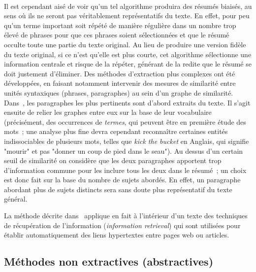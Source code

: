\documentclass[a4paper, 12pt]{article}
\begin{document}
\paragraph{}
Il est cependant aisé de voir qu'un tel algorithme produira des résumés biaisés, au sens où ils ne seront pas véritablement représentatifs du texte. En effet, pour peu qu'un terme important soit répété de manière régulière dans un nombre trop élevé de phrases pour que ces phrases soient sélectionnées et que le résumé occulte toute une partie du texte original. Au lieu de produire une version fidèle du texte original, si ce n'est qu'elle est plus courte, cet algorithme sélectionne une information centrale et risque de la répéter, générant de la redite que le résumé se doit justement d'éliminer. Des méthodes d'extraction plus complexes ont été développées, en faisant notamment intervenir des mesures de similarité entre unités syntaxiques (phrases, paragraphes) au sein d'un graphe de similarité. Dans~\cite{salton_automatic_1997}, les paragraphes les plus pertinents sont d'abord extraits du texte. Il s'agit ensuite de relier les graphes entre eux sur la base de leur vocabulaire (précisément, des occurrences de \emph{termes}, qui peuvent être en première étude des mots~; une analyse plus fine devra cependant reconnaître certaines entités indissociables de plusieurs mots, telles que \textit{kick the bucket} en Anglais, qui signifie "mourir" et pas "donner un coup de pied dans le seau"). Au dessus d'un certain seuil de similarité on considère que les deux paragraphes apportent trop d'information commune pour les inclure tous les deux dans le résumé~; un choix est donc fait sur la base du nombre de sujets abordés. En effet, un paragraphe abordant plus de sujets distincts sera sans doute plus représentatif du texte général.

La méthode décrite dans~\cite{salton_automatic_1997} applique en fait à l'intérieur d'un texte des techniques de récupération  de l'information (\emph{information retrieval}) qui sont utilisées pour établir automatiquement des liens hypertextes entre pages web ou articles.


\subsection{Méthodes non extractives (abstractives)}
\end{document}
